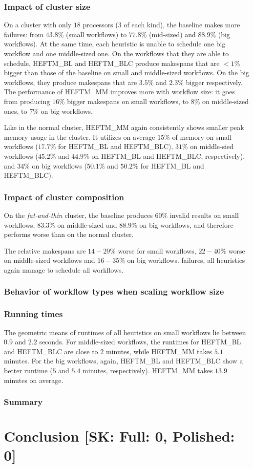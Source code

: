 \documentclass[conference]{IEEEtran}
\newcommand{\algo}[1]{\textsc{#1}}
\newcommand{\heftmm}{\algo{HEFTM\_MM}\xspace}
\newcommand{\heftbl}{\algo{HEFTM\_BL}\xspace}
\newcommand{\heftblc}{\algo{HEFTM\_BLC}\xspace}
\newcommand{\skug}[1]{{\color{blue}[SK: #1]}}
\begin{document}
    \subsubsection{Impact of cluster size}
    On a cluster with only $18$ processors ($3$ of each kind), the baseline makes more failures: from $43.8$\%  (small workflows)
    to $77.8$\% (mid-sized) and $88.9$\% (big workflows).
    At the same time, each heuristic is unable to schedule one big workflow and one middle-sized one.
    On the workflows that they are able to schedule, \heftbl and \heftblc produce makespans that are $<1$\% bigger than
    those of the baseline on small and middle-sized workflows.
    On the big workflows, they produce makespans that are $3.5$\% and $2.3$\% bigger respectively.
    The performance of \heftmm improves more with workflow size: it goes from producing $16$\% bigger makespans on small
    workflows, to $8$\% on middle-sized ones, to $7$\% on big workflows.

   Like in the normal cluster, \heftmm again consistently shows smaller peak memory usage in the cluster.
    It utilizes on average $15$\% of memory on small workflows ($17.7$\% for \heftbl and \heftblc),
    $31$\% on middle-sied workflows ($45.2$\% and $44.9$\% on \heftbl and \heftblc, respectively),
    and $34$\% on big workflows ($50.1$\% and $50.2$\% for \heftbl and \heftblc).

    \subsubsection{Impact of cluster composition}
    On the {\em fat-and-thin} cluster, the baseline produces $60$\% invalid results on small workflows, $83.3$\% on
    middle-sized and $88.9$\% on big workflows, and therefore performs worse than on the normal cluster.

    The relative makespans are $14-29$\% worse for small workflows, $22-40$\% worse on middle-sized workflows and $16-35$\%
    on big workflows.
    \wrt failures, all heuristics again manage to schedule all workflows.
    \subsubsection{Behavior of workflow types when scaling workflow size}
    \subsubsection{Running times}
    The geometric means of runtimes of all heuristics on small workflows lie between $0.9$ and $2.2$ seconds.
    For middle-sized workflows, the runtimes for \heftbl and \heftblc are close to $2$ minutes, while \heftmm
    takes $5.1$ minutes.
    For the big workflows, again, \heftbl and \heftblc show a better runtime ($5$ and $5.4$ minutes, respectively).
    \heftmm takes $13.9$ minutes on average.
    \subsubsection{Summary}

    \section{Conclusion  \skug{Full: 0, Polished: 0}}

    
    
\end{document}
